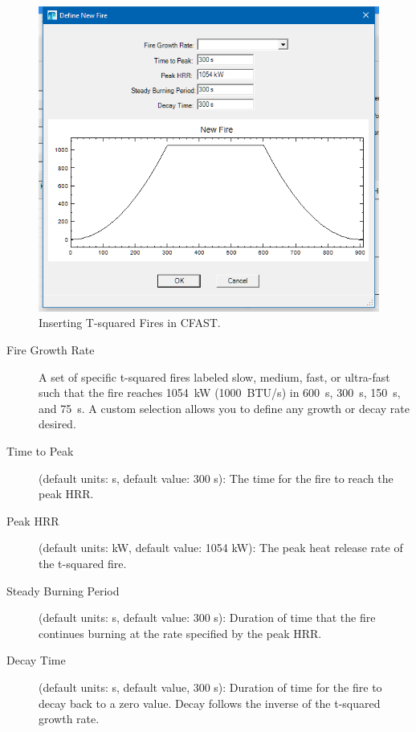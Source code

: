 \begin{figure}[h!]
\begin{center}
\includegraphics[width=5in]{FIGURES/Create_t2}
\caption[Inserting T-squared Fires in CFAST]{Inserting T-squared Fires in CFAST.}
\end{center}
\end{figure}

\begin{description}
\item[Fire Growth Rate] A set of specific t-squared fires labeled slow, medium, fast, or ultra-fast such that the fire reaches 1054~kW (1000~BTU/s) in 600~s, 300~s, 150~s, and 75~s.  A custom selection allows you to define any growth or decay rate desired.
\item[Time to Peak] (default units: s, default value: 300 s): The time for the fire to reach the peak HRR.
\item[Peak HRR] (default units: kW, default value: 1054 kW): The peak heat release rate of the t-squared fire.
\item[Steady Burning Period] (default units: s, default value: 300 s): Duration of time that the fire continues burning at the rate specified by the peak HRR.
\item[Decay Time] (default units: s, default value, 300 s): Duration of time for the fire to decay back to a zero value.  Decay follows the inverse of the t-squared growth rate.
\end{description}








